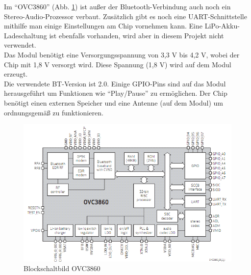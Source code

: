 \newpage
Im \enquote{OVC3860} (Abb. \ref {fig:3.3.2}) ist außer der Bluetooth-Verbindung auch noch ein Stereo-Audio-Prozessor verbaut.
Zusätzlich gibt es noch eine UART-Schnittstelle mithilfe man einige Einstellungen am Chip vornehmen kann.
Eine LiPo-Akku-Ladeschaltung ist ebenfalls vorhanden, wird aber in diesem Projekt nicht verwendet.
\\
Das Modul benötigt eine Versorgungsspannung von 3,3 V bis 4,2 V, wobei der Chip mit 1,8 V versorgt wird.
Diese Spannung (1,8 V) wird auf dem Modul erzeugt.
\\
Die verwendete BT-Version ist 2.0.
Einige GPIO-Pins sind auf das Modul herausgeführt um Funktionen wie \enquote{Play/Pause} zu ermöglichen.
Der Chip benötigt einen externen Speicher und eine Antenne (auf dem Modul) um ordnungsgemäß zu funktionieren.
\begin{figure} [H]
	\centering
	\includegraphics[width=1\textwidth]{img/BTModul/blockschaltbild.png}
	\caption[Blockschaltbild OVC3860]{Blockschaltbild OVC3860\footnotemark}\label {fig:3.3.2}
\end{figure}

\newpage
